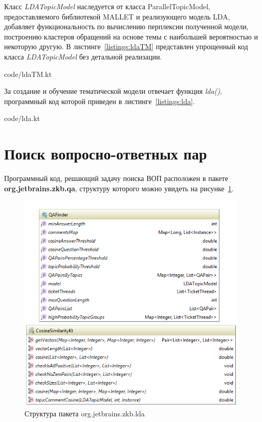 Класс \textit{LDATopicModel} наследуется от класса ParallelTopicModel, предоставляемого библиотекой MALLET и реализующего модель LDA, добавляет функциональность по вычислению перплексии полученной модели, построению кластеров обращений на основе темы с наибольшей вероятностью и некоторую другую. В листинге~\ref{listings:ldaTM} представлен упрощенный код класса \textit{LDATopicModel} без детальной реализации.


{code/ldaTM.kt}

За создание и обучение тематической модели отвечает функция \textit{lda()}, программный код которой приведен в листинге~\ref{listings:lda}.


{code/lda.kt}

\section{Поиск вопросно-ответных пар}
Программный код, решающий задачу поиска ВОП расположен в пакете \textbf{org.jetbrains.zkb.qa}, структуру которого можно увидеть на рисунке~\ref{fig:qapck}.

\begin{figure}[tph!]
\centerline{\includegraphics[width=11cm]{fig/qapck.png}}
    \caption{Структура пакета org.jetbrains.zkb.lda}
    \label{fig:qapck}
\end{figure}


